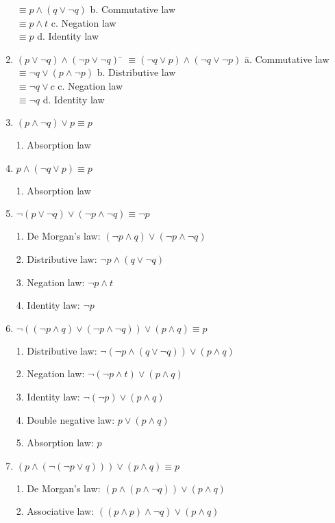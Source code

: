 \documentclass{article}
\begin{document}
\begin{enumerate}[label=\textbf{\arabic*.}]
\begin{tabbing}
\> $\equiv p \land (q \lor \neg q)$ \> b. Commutative law\\
\> $\equiv p \land t$ \> c. Negation law\\
\> $\equiv p$ \> d. Identity law
\end{tabbing}
\item %
\begin{tabbing}
$(p \lor \neg q) \land (\neg p \lor \neg q)$ \= $\equiv (\neg q \lor p) \land (\neg q \lor \neg p)$ \hspace{1cm} \= a. Commutative law\\
\> $\equiv \neg q \lor (p \land \neg p)$ \> b. Distributive law\\
\> $\equiv \neg q \lor c$ \> c. Negation law\\
\> $\equiv \neg q$ \> d. Identity law
\end{tabbing}
\item %
$(p \land \neg q) \lor p \equiv p$

1. Absorption law
\item %
$p \land (\neg q \lor p) \equiv p$

1. Absorption law
\item %
$\neg (p \lor \neg q) \lor (\neg p \land \neg q) \equiv \neg p$

1. De Morgan's law: $(\neg p \land q) \lor (\neg p \land \neg q)$

2. Distributive law: $\neg p \land (q \lor \neg q)$

3. Negation law: $\neg p \land t$

4. Identity law: $\neg p$
\item %
$\neg ((\neg p \land q) \lor (\neg p \land \neg q)) \lor (p \land q) \equiv p$

1. Distributive law: $\neg (\neg p \land (q \lor \neg q)) \lor (p \land q)$

2. Negation law: $\neg (\neg p \land t) \lor (p \land q)$

3. Identity law: $\neg (\neg p) \lor (p \land q)$

4. Double negative law: $p \lor (p \land q)$

5. Absorption law: $p$
\item %
$(p \land (\neg(\neg p \lor q))) \lor (p \land q) \equiv p$

1. De Morgan's law: $(p \land (p \land \neg q)) \lor (p \land q)$

2. Associative law: $((p \land p) \land \neg q) \lor (p \land q)$ 


\end{enumerate}
\end{document}
